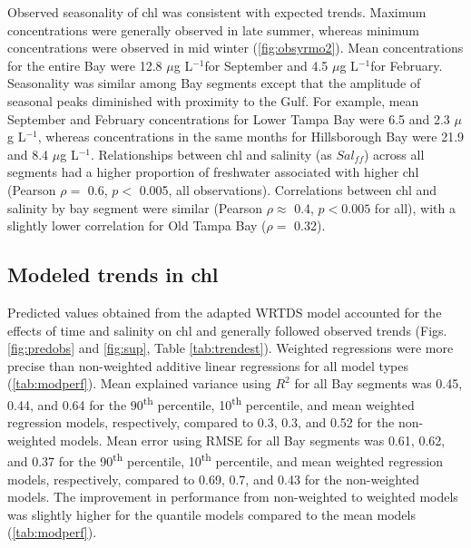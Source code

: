 \documentclass{svjour3}\usepackage[]{graphicx}\usepackage[]{color}
\newcommand{\mugl}{$\mu$g L$^{-1}$}
\begin{document}
Observed seasonality of \ac{chl} was consistent with expected trends.  Maximum concentrations were generally observed in late summer, whereas minimum concentrations were observed in mid winter (\cref{fig:obsyrmo2}).  Mean concentrations for the entire Bay were 12.8 \mugl for September and 4.5 \mugl for February.  Seasonality was similar among Bay segments except that the amplitude of seasonal peaks diminished with proximity to the Gulf.  For example, mean September and February concentrations for Lower Tampa Bay were 6.5 and 2.3 \mugl, whereas concentrations in the same months for Hillsborough Bay were 21.9 and 8.4 \mugl.  Relationships between \ac{chl} and salinity (as $Sal_{ff}$) across all segments had a higher proportion of freshwater associated with higher \ac{chl} (Pearson $\rho=$ 0.6, $p<$ 0.005, all observations).  Correlations between \ac{chl} and salinity by bay segment were similar (Pearson $\rho \approx$ 0.4, $p<0.005$ for all), with a slightly lower correlation for Old Tampa Bay ($\rho=$ 0.32).

\subsection{Modeled trends in \acl{chl}}

Predicted values obtained from the adapted \ac{WRTDS} model accounted for the effects of time and salinity on \ac{chl} and generally followed observed trends (Figs. \ref{fig:predobs} and \ref{fig:sup}, Table \ref{tab:trendest}).  Weighted regressions were more precise than non-weighted additive linear regressions for all model types (\cref{tab:modperf}).   Mean explained variance using $R^2$ for all Bay segments was 0.45, 0.44, and 0.64 for the 90\textsuperscript{th} percentile, 10\textsuperscript{th} percentile, and mean weighted regression models, respectively, compared to 0.3, 0.3, and 0.52 for the non-weighted models.  Mean error using \ac{RMSE} for all Bay segments was 0.61, 0.62, and 0.37 for the 90\textsuperscript{th} percentile, 10\textsuperscript{th} percentile, and mean weighted regression models, respectively, compared to 0.69, 0.7, and 0.43 for the non-weighted models.  The improvement in performance from non-weighted to weighted models was slightly higher for the quantile models compared to the mean models (\cref{tab:modperf}).    
\end{document}
